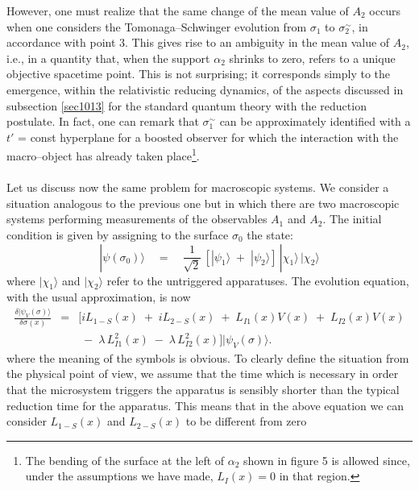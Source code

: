 \documentclass[10pt,a4paper]{article}
\begin{document}
However, one must realize that the same change of the mean value
of $A_{2}$ occurs when one considers the Tomonaga--Schwinger
evolution from $\sigma_{1}$ to $\sigma_{2}^{\sim}$, in accordance
with point 3. This gives rise to an ambiguity in the mean value of
$A_{2}$, i.e., in a quantity that, when the support $\alpha_{2}$
shrinks to zero, refers to a unique objective spacetime point.
This is not surprising; it corresponds simply to the emergence,
within the relativistic reducing dynamics, of the aspects
discussed in subsection \ref{sec1013} for the standard quantum
theory with the reduction postulate. In fact, one can remark that
$\sigma_{1}^{\sim}$ can be approximately identified with a $t'$ =
const hyperplane for a boosted observer for which the interaction
with the macro--object has already taken place\footnote{The
bending of the surface at the left of $\alpha_{2}$ shown in figure
5 is allowed since, under the assumptions we have made, $L_{I}(x)
= 0$ in that region.}.
\\ \\
 Let us discuss now the same problem for
macroscopic systems. We consider a situation analogous to the
previous one but in which there are two macroscopic systems
performing measurements of the observables $A_{1}$ and $A_{2}$.
The initial condition is given by assigning to the surface
$\sigma_{0}$ the state:
\begin{equation}
|\psi(\sigma_{0})\rangle \quad = \quad \frac{1}{\sqrt{2}}\, [
|\psi_{1}\rangle \; + \; |\psi_{2}\rangle ]\, |\chi_{1}\rangle\,
|\chi_{2}\rangle
\end{equation}
where $|\chi_{1}\rangle$ and $|\chi_{2}\rangle$ refer to the
untriggered apparatuses. The evolution equation, with the usual
approximation, is now
\begin{eqnarray} \label{qeqgter}
\frac{\delta |\psi_{V}(\sigma)\rangle}{\delta\sigma(x)} & = & [i
L_{1-S}(x) \; + \; i L_{2-S}(x) \; + \; L_{I1}(x)V(x)
\; + \; L_{I2}(x)V(x) \nonumber \\
& & \; - \; \lambda\, L_{I1}^{2}(x) \; - \; \lambda\,
L_{I2}^{2}(x) ] |\psi_{V}(\sigma)\rangle.
\end{eqnarray}
where the meaning of the symbols is obvious. To clearly define the
situation from the physical point of view, we assume that the time
which is necessary in order that the microsystem triggers the
apparatus is sensibly shorter than the typical reduction time for
the apparatus. This means that in the above equation we can
consider $L_{1-S}(x)$ and $L_{2-S}(x)$ to be different from zero
\end{document}
